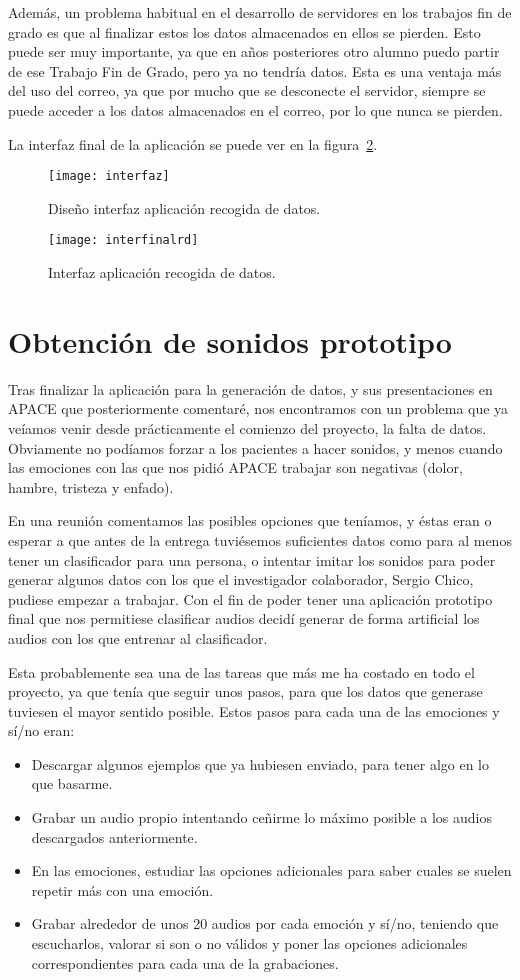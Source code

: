 Además, un problema habitual en el desarrollo de servidores en los trabajos fin de grado es que al finalizar estos los datos almacenados en ellos se pierden. Esto puede ser muy importante, ya que en años posteriores otro alumno puedo partir de ese Trabajo Fin de Grado, pero ya no tendría datos. Esta es una ventaja más del uso del correo, ya que por mucho que se desconecte el servidor, siempre se puede acceder a los datos almacenados en el correo, por lo que nunca se pierden.

La interfaz final de la aplicación se puede ver en la figura~\ref{fig:interfinalrd}.
\begin{figure}
	\centering
	\texttt{[image: interfaz]}
	\caption{Diseño interfaz aplicación recogida de datos.}
	\label{fig:interrd}
\end{figure}
\begin{figure}
	\centering
	\texttt{[image: interfinalrd]}
	\caption{Interfaz aplicación recogida de datos.}
	\label{fig:interfinalrd}
\end{figure}

\section{Obtención de sonidos prototipo}
Tras finalizar la aplicación para la generación de datos, y sus presentaciones en APACE que posteriormente comentaré, nos encontramos con un problema que ya veíamos venir desde prácticamente el comienzo del proyecto, la falta de datos. Obviamente no podíamos forzar a los pacientes a hacer sonidos, y menos cuando las emociones con las que nos pidió APACE trabajar son negativas (dolor, hambre, tristeza y enfado).

En una reunión comentamos las posibles opciones que teníamos, y éstas eran o esperar a que antes de la entrega tuviésemos suficientes datos como para al menos tener un clasificador para una persona, o intentar imitar los sonidos para poder generar algunos datos con los que el investigador colaborador, Sergio Chico, pudiese empezar a trabajar. Con el fin de poder tener una aplicación prototipo final que nos permitiese clasificar audios decidí generar de forma artificial los audios con los que entrenar al clasificador.

Esta probablemente sea una de las tareas que más me ha costado en todo el proyecto, ya que tenía que seguir unos pasos, para que los datos que generase tuviesen el mayor sentido posible. Estos pasos para cada una de las emociones y sí/no eran:
\begin{itemize}
	\item Descargar algunos ejemplos que ya hubiesen enviado, para tener algo en lo que basarme.
	\item Grabar un audio propio intentando ceñirme lo máximo posible a los audios descargados anteriormente.
	\item En las emociones, estudiar las opciones adicionales para saber cuales se suelen repetir más con una emoción.
	\item Grabar alrededor de unos 20 audios por cada emoción y sí/no, teniendo que escucharlos, valorar si son o no válidos y poner las opciones adicionales correspondientes para cada una de la grabaciones.
\end{itemize}
